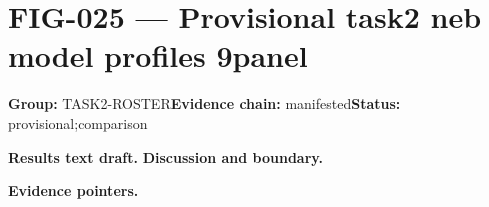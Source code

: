 \clearpage
\section{FIG-025 --- Provisional task2 neb model profiles 9panel}
\label{figpage:fig-025}
\textbf{Group:} TASK2-ROSTER\quad \textbf{Evidence chain:} manifested\quad \textbf{Status:} provisional;comparison

\textbf{Results text draft.} 
\textbf{Discussion and boundary.} 


\textbf{Evidence pointers.}



\vfill
